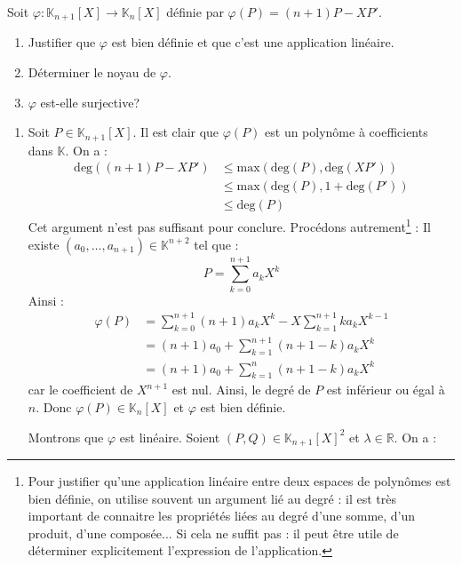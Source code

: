 \documentclass[a4paper,10pt]{report}
\begin{document}
\medskip

\begin{Exercice}{} Soit $\varphi : \mathbb{K}_{n+1}[X]\rightarrow \mathbb{K}_{n}[X]$ définie par $\varphi(P) = (n + 1)P - XP'$.
    \begin{enumerate}
      \item
        Justifier que $\varphi$ est bien définie et que c'est une application linéaire.
      \item
        Déterminer le noyau de $\varphi$.
      \item
        $\varphi$ est-elle surjective?
    \end{enumerate}
\end{Exercice}

\corr \begin{enumerate}
\item Soit $P \in \mathbb{K}_{n+1}[X]$. Il est clair que $\varphi(P)$ est un polynôme à coefficients dans $\mathbb{K}$. On a :
\begin{align*}
\textrm{deg}((n+1)P -XP') & \leq  \textrm{max}(\textrm{deg}(P), \textrm{deg}(XP')) \\
& \leq  \textrm{max}(\textrm{deg}(P), 1 +\textrm{deg}(P') ) \\
 &\leq  \textrm{deg}(P) 
\end{align*}
Cet argument n'est pas suffisant pour conclure. Procédons autrement\footnote{Pour justifier qu'une application linéaire entre deux espaces de polynômes est bien définie, on utilise souvent un argument lié au degré : il est très important de connaitre les propriétés liées au degré d'une somme, d'un produit, d'une composée... Si cela ne suffit pas : il peut être utile de déterminer explicitement l'expression de l'application.} : Il existe $(a_0, \ldots, a_{n+1}) \in \mathbb{K}^{n+2}$ tel que :
$$ P = \sum_{k=0}^{n+1} a_k X^k $$
Ainsi :
\begin{align*}
\varphi(P) & = \sum_{k=0}^{n+1} (n+1) a_k X^k - X \sum_{k=1}^{n+1} k a_k X^{k-1}  \\
& = (n+1)a_0  + \sum_{k=1}^{n+1} (n+1-k)a_k X^k  \\
& = (n+1)a_0 + \sum_{k=1}^{n} (n+1-k)a_k X^k  
\end{align*} 
car le coefficient de $X^{n+1}$ est nul. Ainsi, le degré de $P$ est inférieur ou égal à $n$. Donc $\varphi(P) \in \mathbb{K}_n[X]$ et $\varphi$ est bien définie.

\medskip

\noindent Montrons que $\varphi$ est linéaire. Soient $(P,Q) \in \mathbb{K}_{n+1}[X]^2$ et $\lambda \in \mathbb{R}$. On a :


\end{enumerate}
\end{document}
